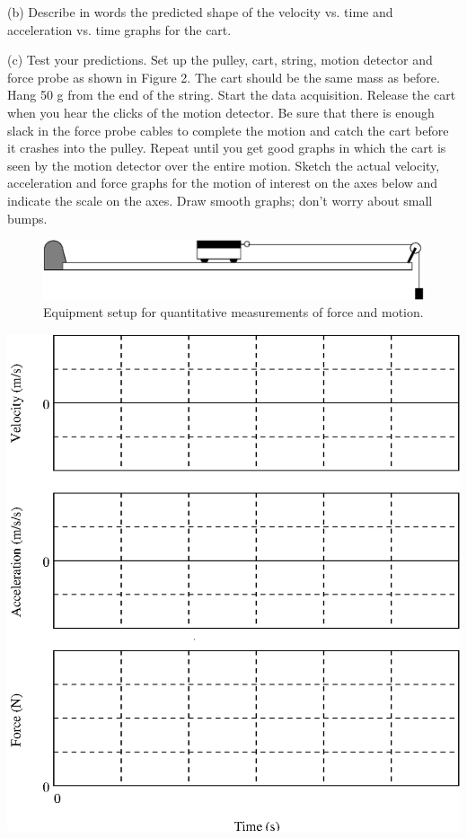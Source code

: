 (b) Describe in words the predicted shape of the velocity vs. time and acceleration
vs. time graphs for the cart.
\vspace{20mm}

\newpage

(c) Test your predictions. Set up the pulley, cart, string, motion detector
and force probe as shown in Figure 2. The cart should be the same mass as before. Hang 50 g from the end of the string. Start the data acquisition.
Release the cart when you hear the clicks of the motion detector. Be sure that
there is enough slack in the force probe cables to complete the motion and catch
the cart before it crashes into the pulley. Repeat until you get good graphs
in which the cart is seen by the motion detector over the entire motion. Sketch
the actual velocity, acceleration and force graphs for the motion of interest
on the axes below and indicate the scale on the axes. Draw smooth graphs; don't
worry about small bumps.

\begin{figure}
{\par\centering \includegraphics{force1_fig4.eps} \par}


\caption{Equipment setup for quantitative measurements of force and motion.}
\end{figure}


\vspace{0.3cm}
{\par\centering \includegraphics{force1_fig5.eps} \par}
\vspace{0.3cm}

